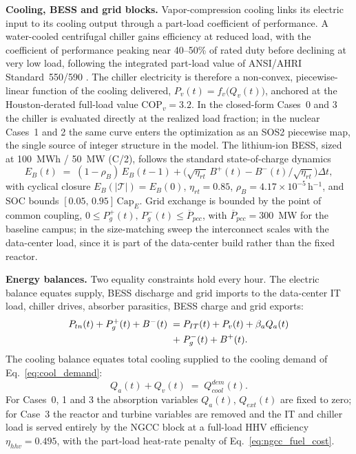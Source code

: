 \documentclass[a4paper,fleqn]{cas-sc}
\newcommand{\runinhead}[1]{\par\smallskip\noindent\textbf{#1.}\quad}
\begin{document}
\runinhead{Cooling, BESS and grid blocks}
Vapor-compression cooling links its electric input to its cooling output through a part-load coefficient of performance. A water-cooled centrifugal chiller gains efficiency at reduced load, with the coefficient of performance peaking near 40--50\% of rated duty before declining at very low load, following the integrated part-load value of ANSI/AHRI Standard~550/590 \citep{ahri2020standard550}. The chiller electricity is therefore a non-convex, piecewise-linear function of the cooling delivered, $P_v(t)=f_v\!\big(Q_v(t)\big)$, anchored at the Houston-derated full-load value $\mathrm{COP}_v=3.2$. In the closed-form Cases~0 and 3 the chiller is evaluated directly at the realized load fraction; in the nuclear Cases~1 and 2 the same curve enters the optimization as an SOS2 piecewise map, the single source of integer structure in the model. The lithium-ion BESS, sized at 100~MWh / 50~MW (C/2), follows the standard state-of-charge dynamics
\begin{equation}
\label{eq:bess_soc}
E_B(t) \;=\; (1-\rho_B)\,E_B(t-1) + \big(\sqrt{\eta_{rt}}\,B^{+}(t) - B^{-}(t)/\sqrt{\eta_{rt}}\big)\Delta t,
\end{equation}
with cyclical closure $E_B(|\mathcal{T}|) = E_B(0)$, $\eta_{rt}=0.85$, $\rho_B=4.17\times10^{-5}$\,h$^{-1}$, and SOC bounds $[0.05,\, 0.95]\,\mathrm{Cap}_E$. Grid exchange is bounded by the point of common coupling, $0 \le P_g^{+}(t),\, P_g^{-}(t) \le \overline{P}_{pcc}$, with $\overline{P}_{pcc}=300$~MW for the baseline campus; in the size-matching sweep the interconnect scales with the data-center load, since it is part of the data-center build rather than the fixed reactor.

\runinhead{Energy balances}
Two equality constraints hold every hour. The electric balance equates supply, BESS discharge and grid imports to the data-center IT load, chiller drives, absorber parasitics, BESS charge and grid exports:
\begin{align}
\label{eq:elec_balance}
P_{tn}(t) + P_g^{+}(t) + B^{-}(t)
\;=\; & P_{IT}(t) + P_v(t) + \beta_a Q_a(t) \notag\\
\;+\; & P_g^{-}(t) + B^{+}(t).
\end{align}
The cooling balance equates total cooling supplied to the cooling demand of Eq.~\eqref{eq:cool_demand}:
\begin{equation}
\label{eq:cool_balance}
Q_a(t) + Q_v(t) \;=\; Q_{cool}^{dem}(t).
\end{equation}
For Cases~0, 1 and 3 the absorption variables $Q_a(t)$, $Q_{ext}(t)$ are fixed to zero; for Case~3 the reactor and turbine variables are removed and the IT and chiller load is served entirely by the NGCC block at a full-load HHV efficiency $\eta_{hhv}=0.495$, with the part-load heat-rate penalty of Eq.~\eqref{eq:ngcc_fuel_cost}.
\end{document}
